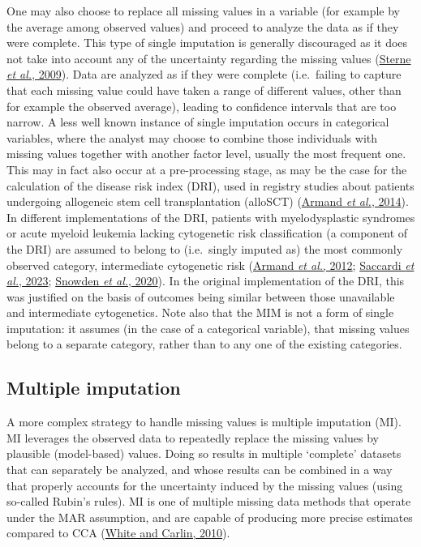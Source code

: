 \documentclass[
  letterpaper,
  DIV=11,
  numbers=noendperiod]{scrreprt}
\begin{document}
One may also choose to replace all missing values in a variable (for
example by the average among observed values) and proceed to analyze the
data as if they were complete. This type of single imputation is
generally discouraged as it does not take into account any of the
uncertainty regarding the missing values
(\protect\hyperlink{ref-sterneMultipleImputationMissing2009}{Sterne
\emph{et al.}, 2009}). Data are analyzed as if they were complete
(i.e.~failing to capture that each missing value could have taken a
range of different values, other than for example the observed average),
leading to confidence intervals that are too narrow. A less well known
instance of single imputation occurs in categorical variables, where the
analyst may choose to combine those individuals with missing values
together with another factor level, usually the most frequent one. This
may in fact also occur at a pre-processing stage, as may be the case for
the calculation of the disease risk index (DRI), used in registry
studies about patients undergoing allogeneic stem cell transplantation
(alloSCT)
(\protect\hyperlink{ref-armandValidationRefinementDisease2014}{Armand
\emph{et al.}, 2014}). In different implementations of the DRI, patients
with myelodysplastic syndromes or acute myeloid leukemia lacking
cytogenetic risk classification (a component of the DRI) are assumed to
belong to (i.e.~singly imputed as) the most commonly observed category,
intermediate cytogenetic risk
(\protect\hyperlink{ref-armandDiseaseRiskIndex2012}{Armand \emph{et
al.}, 2012};
\protect\hyperlink{ref-saccardiBenchmarkingSurvivalOutcomes2023}{Saccardi
\emph{et al.}, 2023};
\protect\hyperlink{ref-snowdenBenchmarkingSurvivalOutcomes2020}{Snowden
\emph{et al.}, 2020}). In the original implementation of the DRI, this
was justified on the basis of outcomes being similar between those
unavailable and intermediate cytogenetics. Note also that the MIM is not
a form of single imputation: it assumes (in the case of a categorical
variable), that missing values belong to a separate category, rather
than to any one of the existing categories.

\hypertarget{multiple-imputation}{%
\subsection{Multiple imputation}\label{multiple-imputation}}

A more complex strategy to handle missing values is multiple imputation
(MI). MI leverages the observed data to repeatedly replace the missing
values by plausible (model-based) values. Doing so results in multiple
`complete' datasets that can separately be analyzed, and whose results
can be combined in a way that properly accounts for the uncertainty
induced by the missing values (using so-called Rubin's rules). MI is one
of multiple missing data methods that operate under the MAR assumption,
and are capable of producing more precise estimates compared to CCA
(\protect\hyperlink{ref-whiteBiasEfficiencyMultiple2010}{White and
Carlin, 2010}).
\end{document}
